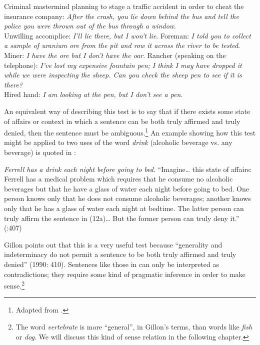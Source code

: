 \ea \label{ex:5.11}
\ea  Criminal mastermind planning to stage a traffic accident in order to cheat the insurance company: \textit{After the crash, you lie down behind the bus and tell the police you were thrown out of the bus through a window}.\\
Unwilling accomplice: \textit{I’ll lie there, but I won’t lie}.
\ex   Foreman: \textit{I told you to collect a sample of uranium ore from the pit and row it across the river to be tested}.\\
Miner: \textit{I have the ore but I don’t have the oar}.
\ex   Rancher (speaking on the telephone): \textit{I’ve lost my expensive fountain pen; I think I may have dropped it while we were inspecting the sheep. Can you check the sheep pen to see if it is there?}\\
Hired hand: \textit{I am looking at the pen, but I don’t see a pen}.
\z \z


An equivalent way of describing this test is to say that if there exists some state of affairs or context in which a sentence can be both truly affirmed and truly denied, then the sentence must be ambiguous.\footnote{Adapted from \citet[407]{Gillon1990}.} An example showing how this test might be applied to two uses of the word \textit{drink} (alcoholic beverage vs. any beverage) is quoted in :


\ea \label{ex:5.12}
\ea \textit{Ferrell has a drink each night before going to bed}.
\ex  “Imagine… this state of affairs: Ferrell has a medical problem which requires that he consume no alcoholic beverages but that he have a glass of water each night before going to bed. One person knows only that he does not consume alcoholic beverages; another knows only that he has a glass of water each night at bedtime. The latter person can truly affirm the sentence in (12a)… But the former person can truly deny it.” (\citealt{Gillon1990}:407)
\z \z


Gillon points out that this is a very useful test because “generality and indeterminacy do not permit a sentence to be both truly affirmed and truly denied” (1990: 410). Sentences like those in  can only be interpreted as contradictions; they require some kind of pragmatic inference in order to make sense.\footnote{The word \textit{vertebrate} is more “general”, in Gillon’s terms, than words like \textit{fish} or \textit{dog}. We will discuss this kind of sense relation in the following chapter.}


\ea \label{ex:5.13}
                       \z
\z

